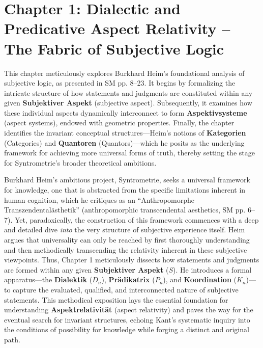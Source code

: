 \documentclass[12pt]{article}
\newcommand{\q}[1]{\enquote{#1}}
\newcommand{\subjektiveraspekt}{S}
\newcommand{\pradikatrix}{P}
\newcommand{\dialektik}{D}
\newcommand{\koordination}{K}
\begin{document}
\section{Chapter 1: Dialectic and Predicative Aspect Relativity – The Fabric of Subjective Logic}
\label{sec:chapter1}

This chapter meticulously explores Burkhard Heim's foundational analysis of subjective logic, as presented in SM pp. 8--23. It begins by formalizing the intricate structure of how statements and judgments are constituted within any given \textbf{Subjektiver Aspekt} (subjective aspect). Subsequently, it examines how these individual aspects dynamically interconnect to form \textbf{Aspektivsysteme} (aspect systems), endowed with geometric properties. Finally, the chapter identifies the invariant conceptual structures—Heim's notions of \textbf{Kategorien} (Categories) and \textbf{Quantoren} (Quantors)—which he posits as the underlying framework for achieving more universal forms of truth, thereby setting the stage for Syntrometrie's broader theoretical ambitions.

Burkhard Heim's ambitious project, Syntrometrie, seeks a universal framework for knowledge, one that is abstracted from the specific limitations inherent in human cognition, which he critiques as an \q{Anthropomorphe Transzendental\"{a}sthetik} (anthropomorphic transcendental aesthetics, SM pp. 6--7). Yet, paradoxically, the construction of this framework commences with a deep and detailed dive \textit{into} the very structure of subjective experience itself. Heim argues that universality can only be reached by first thoroughly understanding and then methodically transcending the relativity inherent in these subjective viewpoints. Thus, Chapter 1 meticulously dissects how statements and judgments are formed within any given \textbf{Subjektiver Aspekt} (\(\subjektiveraspekt\)). He introduces a formal apparatus—the \textbf{Dialektik} (\(\dialektik_n\)), \textbf{Pr\"{a}dikatrix} (\(\pradikatrix_n\)), and \textbf{Koordination} (\(\koordination_n\))—to capture the evaluated, qualified, and interconnected nature of subjective statements. This methodical exposition lays the essential foundation for understanding \textbf{Aspektrelativit\"{a}t} (aspect relativity) and paves the way for the eventual search for invariant structures, echoing Kant’s systematic inquiry into the conditions of possibility for knowledge while forging a distinct and original path.
\end{document}
